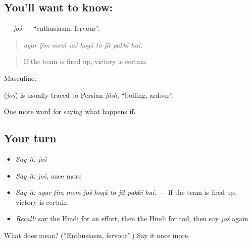 \subsection*{You'll want to know: }
\textbf{} — \emph{joś} — \textquotedblleft{}enthusiasm, fervour\textquotedblright{}.

\begin{quote}
        
\end{quote}

\begin{quote}
\emph{agar ṭīm meṁ joś hogā to jīt pakkī hai.}
\end{quote}

\begin{quote}
If the team is fired up, victory is certain.
\end{quote}

Masculine.

\begin{cousinweb}
\textbf{} (\emph{joś}) is usually traced to Persian \emph{jōsh}, \textquotedblleft{}boiling, ardour\textquotedblright{}.
\end{cousinweb}

\begin{grammarlens}[title={What you've built}]
One more word for saying what happens if.
\end{grammarlens}

\subsection*{Your turn}
\begin{itemize}
\raggedright
  \item \emph{Say it:} \emph{joś}
  \item \emph{Say it:} \emph{joś}, once more
  \item \emph{Say it:} \emph{agar ṭīm meṁ joś hogā to jīt pakkī hai.} — If the team is fired up, victory is certain.
  \item \emph{Recall:} say the Hindi for an effort, then the Hindi for toil, then say \emph{joś} again
\end{itemize}

\begin{tcolorbox}[breakable,colback=teal!4,colframe=teal!35!black,title={Before you move on}]
What does  mean? (\textquotedblleft{}Enthusiasm, fervour\textquotedblright{}.) Say it once more.
\end{tcolorbox}
